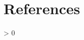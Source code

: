 \documentclass[11pt,
  english,
  letterpaper,
]{article}
\newlength{\cslhangindent}
\newenvironment{CSLReferences}[2] %
 {%
  \setlength{\parindent}{0pt}
  \ifodd #1 \everypar{\setlength{\hangindent}{\cslhangindent}}\ignorespaces\fi
  \ifnum #2 > 0
  \setlength{\parskip}{#2\baselineskip}
  \fi
 }%
 {}
\begin{document}
\leavevmode\tagmcend\tagstructend

\clearpage


\hypertarget{references}{%
\section{References}\label{references}}

\leavevmode\tagmcend\tagstructend


\hypertarget{refs}{}
\begin{CSLReferences}{0}{0}
\end{CSLReferences}

\leavevmode\tagmcend\tagstructend
\end{document}
